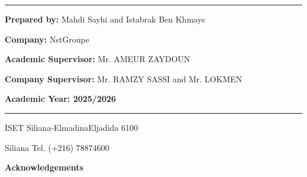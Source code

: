 \documentclass[12pt,a4paper]{article}
\begin{document}
\begin{titlepage}
\vspace{0.32cm}
{\color{blue}\rule{0.84\textwidth}{1.7pt}}\par

\vspace{0.78cm}
\begin{flushleft}
{\bfseries\Large Prepared by:} {\large Mahdi Sayhi and Istabrak Ben Khmays}\par
\vspace{0.22cm}
{\bfseries\Large Company:} {\large NstGroupe}\par
\vspace{0.22cm}
{\bfseries\Large Academic Supervisor:} {\large Mr. AMEUR ZAYDOUN}\par
\vspace{0.22cm}
{\bfseries\Large Company Supervisor:} {\large Mr. RAMZY SASSI and Mr. LOKMEN}\par
\end{flushleft}

\vfill
{\bfseries\fontsize{16}{18}\selectfont Academic Year: 2025/2026\par}
\vspace{0.28cm}

\rule{\textwidth}{0.4pt}\par
\vspace{0.05cm}

\begin{minipage}[t]{0.58\textwidth}
\raggedright\normalsize ISET Siliana-ElmadinaEljadida 6100
\end{minipage}%
\begin{minipage}[t]{0.42\textwidth}
\raggedleft\normalsize Siliana Tel. (+216) 78874600
\end{minipage}

\end{titlepage}

\newpage

\begin{center}
{\bfseries\LARGE Acknowledgements\par}
\end{center}

\vspace{1cm}
\end{document}
